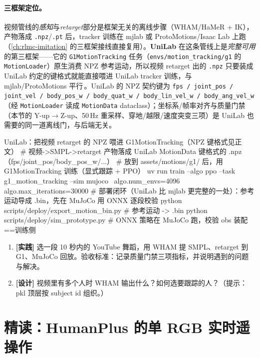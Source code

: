 \paragraph{三框架定位。}视频管线的\emph{感知}与\emph{retarget}部分是框架无关的离线步骤（WHAM/HaMeR + IK），产物落成 \texttt{.npz}/\texttt{.pt} 后，tracker 训练在 mjlab 或 ProtoMotions/Isaac Lab 上跑（\cref{ch:rlmc-imitation} 的三框架接线直接复用）。\textbf{UniLab} 在这条管线上是\emph{完整可用}的第三框架——它的 \verb|G1MotionTracking| 任务（\verb|envs/motion_tracking/g1| 的 \verb|MotionLoader|）原生消费 NPZ 参考运动，所以视频 retarget 出的 \texttt{.npz} 只要装成 UniLab 约定的键格式就能直接喂进 UniLab tracker 训练，与 mjlab/ProtoMotions 平行\,\cite{unilab2026}。UniLab 的 NPZ 契约键为 \verb|fps / joint_pos / joint_vel / body_pos_w / body_quat_w / body_lin_vel_w / body_ang_vel_w|（经 \verb|MotionLoader| 读成 \verb|MotionData| dataclass）；坐标系/帧率对齐与质量门禁（本节的 Y-up$\to$Z-up、50\,Hz 重采样、穿地/越限/速度突变三项）是 UniLab 也需要的同一道离线门，与后端无关。

\begin{codebox}[bash]{UniLab：把视频 retarget 的 NPZ 喂进 G1MotionTracking（NPZ 键格式见正文）}
# 视频->SMPL->retarget 产物落成 UniLab MotionData 键格式的 .npz（fps/joint_pos/body_pos_w/...）
# 放到 assets/motions/g1/ 后，用 G1MotionTracking 训练（显式跟踪 + PPO）
uv run train --algo ppo --task g1_motion_tracking --sim mujoco \
    algo.num_envs=4096 algo.max_iterations=30000
# 部署闭环（UniLab 比 mjlab 更完整的一处）：参考运动导成 .bin，先在 MuJoCo 用 ONNX 逐段校验
python scripts/deploy/export_motion_bin.py      # 参考运动 -> .bin
python scripts/deploy/sim_prototype.py          # ONNX 策略在 MuJoCo 跑，校验 obs 装配==训练侧
\end{codebox}

\begin{practice}[练习·视频管线]
\begin{enumerate}
  \item \textbf{[实践]} 选一段 10 秒内的 YouTube 舞蹈，用 WHAM 提 SMPL、retarget 到 G1、MuJoCo 回放。验收标准：记录质量门禁三项指标，并说明遇到的问题与解决。
  \item \textbf{[设计]} 视频里有多个人时 WHAM 输出什么？如何选要跟踪的人？（提示：pkl 顶层按 subject id 组织。）
\end{enumerate}
\end{practice}

\section{精读：HumanPlus 的单 RGB 实时遥操作}
\label{sec:rlmc-mm-humanplus}

